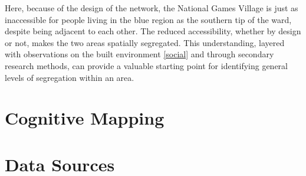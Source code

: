 \documentclass[
]{latex/krantz}
\begin{document}
Here, because of the design of the network, the National Games Village is just as inaccessible for people living in the blue region as the southern tip of the ward, despite being adjacent to each other. The reduced accessibility, whether by design or not, makes the two areas spatially segregated. This understanding, layered with observations on the built environment \ref{social} and through secondary research methods, can provide a valuable starting point for identifying general levels of segregation within an area.

\hypertarget{cognitive-mapping}{%
\section{Cognitive Mapping}\label{cognitive-mapping}}

\hypertarget{data-sources}{%
\section{Data Sources}\label{data-sources}}

\printbibliography
\end{document}
